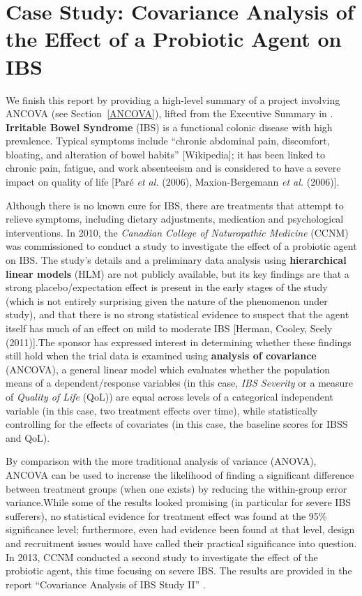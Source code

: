 \section[Case Study: ANCOVA for a Clinical Study]{Case Study: Covariance Analysis of the Effect of a Probiotic Agent on IBS}\label{sec:CCNM}
We finish this report by providing a high-level summary of a project involving ANCOVA (see Section~\ref{ANCOVA}), lifted from the Executive Summary in \cite{CQADS_IBS}. \newl 
\textbf{Irritable Bowel Syndrome} (IBS) is a functional colonic disease with high prevalence. Typical symptoms include ``chronic abdominal pain, discomfort, bloating, and alteration of bowel habits'' [Wikipedia]; it has been linked to chronic pain, fatigue, and work absenteeism and is considered to have a severe impact on quality of life [Par\'e \textit{et al.} (2006), Maxion-Bergemann \textit{et al.} (2006)]. \par Although there is no known cure for IBS, there are treatments that attempt to relieve symptoms, including dietary adjustments, medication and psychological interventions.
\newl In 2010, the \textit{Canadian College of Naturopathic Medicine} (CCNM) was commissioned to conduct a study to investigate the effect of a probiotic agent on IBS. The study's details and a preliminary data analysis using \textbf{hierarchical linear models} (HLM) are not publicly available, but its key findings are that a strong placebo/expectation effect is present in the early stages of the study (which is not entirely surprising given the nature of the phenomenon under study), and that there is no strong statistical evidence to suspect that the agent itself has much of an effect on mild to moderate IBS [Herman, Cooley, Seely (2011)].\newl  The sponsor has expressed interest in determining whether these findings still hold when the trial data is examined using \textbf{analysis of covariance} (ANCOVA), a general linear model which evaluates whether the population means of a dependent/response variables (in this case, \textit{IBS Severity} or a measure of \textit{Quality of Life} (QoL)) are equal across levels of a categorical independent variable (in this case, two treatment effects over time), while statistically controlling for the effects of covariates (in this case, the baseline scores for IBSS and QoL). \par By comparison with the more traditional analysis of variance (ANOVA), ANCOVA can be used to increase the likelihood of finding a significant difference between treatment groups (when one exists) by reducing the within-group error variance.\newl While some of the results looked promising (in particular for severe IBS sufferers), no statistical evidence for treatment effect was found at the 95\% significance level; furthermore, even had evidence been found at that level, design and recruitment issues would have called their practical significance into question. \newl In 2013, CCNM conducted a second study to investigate the effect of the probiotic agent, this time focusing on severe IBS. The results are provided in the report ``Covariance Analysis of IBS Study II'' \cite{CQADS_IBS}.